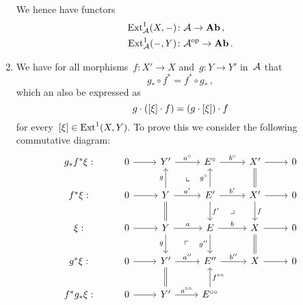 \begin{remark}
\begin{enumerate}
      We hence have functors
      \begin{align*}
        \operatorname{Ext}^1_{\mathcal{A}}(X,-)
        &\colon
        \mathcal{A}
        \to
        \mathbf{Ab} \,,
      \\
        \operatorname{Ext}^1_{\mathcal{A}}(-,Y)
        &\colon
        \mathcal{A}^{\mathrm{op}}
        \to
        \mathbf{Ab} \,.
      \end{align*}
    \item
      We have for all morphisms~$f \colon X' \to X$ and~$g \colon Y \to Y'$ in~$\mathcal{A}$ that
      \[
        g_* \circ f^*
        =
        f^* \circ g_* \,,
      \]
      which an also be expressed as
      \[
        g \cdot ([\xi] \cdot f)
        =
        (g \cdot [\xi]) \cdot f
      \]
      for every~$[\xi] \in \operatorname{Ext}^1(X,Y)$.
      To prove this we consider the following commutative diagram:
      \[
        \begin{tikzcd}
            g_* f^* \xi:
          & 0
            \arrow{r}
          & Y'
            \arrow{r}[above]{a^\circ}
          & E^\circ
            \arrow{r}[above]{b^\circ}
          & X'
            \arrow{r}
          & 0
          \\
            f^* \xi:
          & 0
            \arrow{r}
          & Y
            \arrow{u}[left]{g}
            \arrow[phantom]{ur}[description]{\llcorner}
            \arrow{r}[above]{a'}
            \arrow[equal]{d}
          & E'
            \arrow{u}[left]{g^\circ}
            \arrow{r}[above]{b'}
            \arrow[phantom]{dr}[description]{\lrcorner}
            \arrow{d}[right]{f'}
          & X'
            \arrow[equal]{u}
            \arrow{r}
            \arrow{d}[right]{f}
          & 0
          \\
            \xi:
          & 0
            \arrow{r}
          & Y
            \arrow{r}[above]{a}
            \arrow[phantom]{dr}[description]{\ulcorner}
            \arrow{d}[left]{g}
          & E
            \arrow{r}[above]{b}
            \arrow{d}[left]{g''}
          & X
            \arrow{r}
            \arrow[equal]{d}
          & 0
          \\
            g^* \xi:
          & 0
            \arrow{r}
          & Y'
            \arrow{r}[above]{a''}
          & E''
            \arrow{r}[above]{b''}
          & X
            \arrow{r}
          & 0
          \\
            f^* g_* \xi:
          & 0
            \arrow{r}
          & Y'
            \arrow[equal]{u}
            \arrow{r}[above]{a^{\circ\circ}}
          & E^{\circ\circ}
            \arrow{u}[right]{f^{\circ\circ}}

\end{tikzcd}\]
\end{enumerate}
\end{remark}
